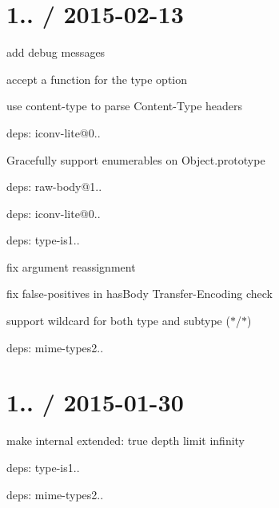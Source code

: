 \section*{1.. / 2015-\/02-\/13 }


\begin{DoxyItemize}
\item add {\ttfamily debug} messages
\item accept a function for the {\ttfamily type} option
\item use {\ttfamily content-\/type} to parse {\ttfamily Content-\/\+Type} headers
\item deps\+: iconv-\/lite@0..
\begin{DoxyItemize}
\item Gracefully support enumerables on {\ttfamily Object.\+prototype}
\end{DoxyItemize}
\item deps\+: raw-\/body@1..
\begin{DoxyItemize}
\item deps\+: iconv-\/lite@0..
\end{DoxyItemize}
\item deps\+: type-\/is1..
\begin{DoxyItemize}
\item fix argument reassignment
\item fix false-\/positives in {\ttfamily has\+Body} {\ttfamily Transfer-\/\+Encoding} check
\item support wildcard for both type and subtype ({\ttfamily $\ast$/$\ast$})
\item deps\+: mime-\/types2..
\end{DoxyItemize}
\end{DoxyItemize}

\section*{1.. / 2015-\/01-\/30 }


\begin{DoxyItemize}
\item make internal {\ttfamily extended\+: true} depth limit infinity
\item deps\+: type-\/is1..
\begin{DoxyItemize}
\item deps\+: mime-\/types2..
\end{DoxyItemize}
\end{DoxyItemize}

